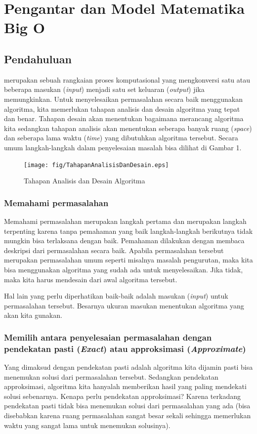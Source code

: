 \chapter{Pengantar dan Model Matematika Big O}\label{ch:modul1}

\section{Pendahuluan}

 merupakan sebuah rangkaian proses komputasional yang mengkonversi satu atau beberapa masukan (\textit{input}) menjadi satu set keluaran (\textit{output}) jika memungkinkan. Untuk menyelesaikan permasalahan secara baik menggunakan algoritma, kita memerlukan tahapan analisis dan desain algoritma yang tepat dan benar. Tahapan desain akan menentukan bagaimana merancang algoritma kita sedangkan tahapan analisis akan menentukan seberapa banyak ruang (\textit{space}) dan seberapa lama waktu (\textit{time}) yang dibutuhkan algoritma tersebut. Secara umum langkah-langkah dalam penyelesaian masalah bisa dilihat di Gambar 1.

\begin{figure}%
\texttt{[image: fig/TahapanAnalisisDanDesain.eps]}%
\caption{Tahapan Analisis dan Desain Algoritma}%
\label{fig:TahapanAnalisisDanDesain}%
\end{figure}

\subsection{Memahami permasalahan}
Memahami permasalahan merupakan langkah pertama dan merupakan langkah terpenting karena tanpa pemahaman yang baik langkah-langkah berikutnya tidak mungkin bisa terlaksana dengan baik. Pemahaman dilakukan dengan membaca deskripsi dari permasalahan secara baik. Apabila permasalahan tersebut merupakan permasalahan umum seperti misalnya masalah pengurutan, maka kita bisa menggunakan algoritma yang sudah ada untuk menyelesaikan. Jika tidak, maka kita harus mendesain dari awal algoritma tersebut.

Hal lain yang perlu diperhatikan baik-baik adalah masukan (\textit{input}) untuk permasalahan tersebut. Besarnya ukuran masukan menentukan algoritma yang akan kita gunakan. 

\subsection{Memilih antara penyelesaian permasalahan dengan pendekatan pasti (\textit{Exact}) atau approksimasi (\textit{Approximate})}
Yang dimaksud dengan pendekatan pasti adalah algoritma kita dijamin pasti bisa menemukan solusi dari permasalahan tersebut. Sedangkan pendekatan approksimasi, algoritma kita hanyalah memberikan hasil yang paling mendekati solusi sebenarnya. Kenapa perlu pendekatan approksimasi? Karena terkadang pendekatan pasti tidak bisa menemukan solusi dari permasalahan yang ada (bisa disebabkan karena ruang permasalahan sangat besar sekali sehingga memerlukan waktu yang sangat lama untuk menemukan solusinya).
 
